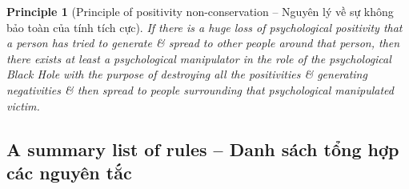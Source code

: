 \documentclass[12pt]{article}
\newtheorem{principle}{Principle}
\begin{document}
\begin{principle}[Principle of positivity non-conservation -- Nguyên lý về sự không bảo toàn của tính tích cực]
	If there is a huge loss of psychological positivity that a person has tried to generate \& spread to other people around that person, then there exists at least a psychological manipulator in the role of the psychological Black Hole with the purpose of destroying all the positivities \& generating negativities \& then spread to people surrounding that psychological manipulated victim.
\end{principle}

\subsection{A summary list of rules -- Danh sách tổng hợp các nguyên tắc}
\end{document}
